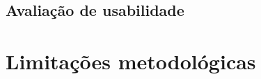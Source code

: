 
\subsection{Avaliação de usabilidade}
\label{subsec:avaliacao-usabilidade}


\section{Limitações metodológicas}
\label{sec:limitacoes-metodologicas}

